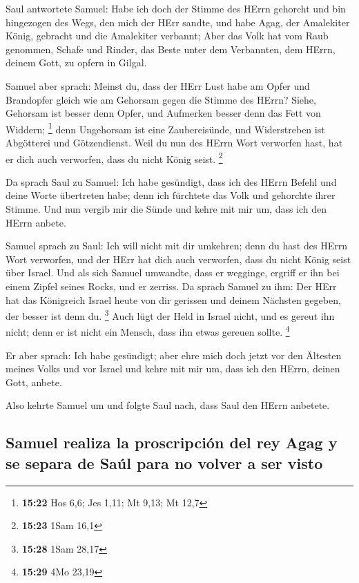  Saul antwortete Samuel: Habe ich doch der Stimme des
HErrn gehorcht und bin hingezogen des Wegs, den mich der HErr sandte,
und habe Agag, der Amalekiter König, gebracht und die Amalekiter
verbannt;  Aber das Volk hat vom Raub genommen, Schafe
und Rinder, das Beste unter dem Verbannten, dem HErrn, deinem Gott, zu
opfern in Gilgal.

 Samuel aber sprach: Meinst du, dass der HErr Lust habe
am Opfer und Brandopfer gleich wie am Gehorsam gegen die Stimme des
HErrn? Siehe, Gehorsam ist besser denn Opfer, und Aufmerken besser denn
das Fett von Widdern; \footnote{\textbf{15:22} Hos 6,6; Jes 1,11; Mt
  9,13; Mt 12,7}  denn Ungehorsam ist eine Zaubereisünde,
und Widerstreben ist Abgötterei und Götzendienst. Weil du nun des HErrn
Wort verworfen hast, hat er dich auch verworfen, dass du nicht König
seist. \footnote{\textbf{15:23} 1Sam 16,1}

 Da sprach Saul zu Samuel: Ich habe gesündigt, dass ich
des HErrn Befehl und deine Worte übertreten habe; denn ich fürchtete das
Volk und gehorchte ihrer Stimme.  Und nun vergib mir die
Sünde und kehre mit mir um, dass ich den HErrn anbete.

 Samuel sprach zu Saul: Ich will nicht mit dir umkehren;
denn du hast des HErrn Wort verworfen, und der HErr hat dich auch
verworfen, dass du nicht König seist über Israel.  Und
als sich Samuel umwandte, dass er wegginge, ergriff er ihn bei einem
Zipfel seines Rocks, und er zerriss.  Da sprach Samuel zu
ihm: Der HErr hat das Königreich Israel heute von dir gerissen und
deinem Nächsten gegeben, der besser ist denn du. \footnote{\textbf{15:28}
  1Sam 28,17}  Auch lügt der Held in Israel nicht, und es
gereut ihn nicht; denn er ist nicht ein Mensch, dass ihn etwas gereuen
sollte. \footnote{\textbf{15:29} 4Mo 23,19}

 Er aber sprach: Ich habe gesündigt; aber ehre mich doch
jetzt vor den Ältesten meines Volks und vor Israel und kehre mit mir um,
dass ich den HErrn, deinen Gott, anbete.

 Also kehrte Samuel um und folgte Saul nach, dass Saul
den HErrn anbetete.

\hypertarget{samuel-realiza-la-proscripciuxf3n-del-rey-agag-y-se-separa-de-sauxfal-para-no-volver-a-ser-visto}{%
\subsection{Samuel realiza la proscripción del rey Agag y se separa de
Saúl para no volver a ser
visto}\label{samuel-realiza-la-proscripciuxf3n-del-rey-agag-y-se-separa-de-sauxfal-para-no-volver-a-ser-visto}}

